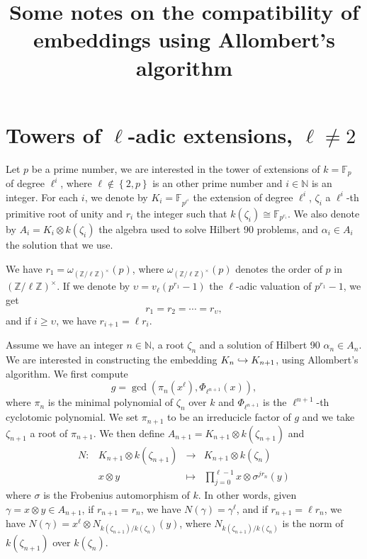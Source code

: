 \documentclass[a4paper,11pt]{article}
\title{Some notes on the compatibility of embeddings using Allombert's algorithm}
\author{}
\begin{document}
\maketitle





\section{Towers of $\ell$-adic extensions, $\ell\neq2$}
\label{sec:ladic}

Let $p$ be a prime number, we are interested in the tower of extensions of
$k=\mathbb{F}_p$ of degree $\ell^i$, where $\ell\notin\left\{ 2, p
\right\}$ is an other prime
number and $i\in\mathbb{N}$ is an integer. For each $i$, we denote by
$K_i=\mathbb{F}_{p^{\ell^i}}$ the extension of degree $\ell^i$, $\zeta_i$ a
$\ell^i$-th primitive root of unity and $r_i$ the integer such that
$k(\zeta_i)\cong\mathbb{F}_{p^{r_i}}$. We also denote by $A_i=K_i\otimes
k(\zeta_i)$ the algebra used to solve Hilbert 90 problems, and $\alpha_i\in A_i$ the
solution that we use.

We have $r_1=\omega_{(\mathbb{Z}/\ell\mathbb{Z})^\times}(p)$, where
$\omega_{(\mathbb{Z}/\ell\mathbb{Z})^\times}(p)$ denotes the order of $p$ in
$(\mathbb{Z}/\ell\mathbb{Z})^\times$. If we denote by $\upsilon=v_\ell(p^{r_1}-1)$
the $\ell$-adic valuation of $p^{r_1}-1$, we get 
\[
  r_1 = r_2 = \cdots = r_{\upsilon},
\]
and if $i\geq\upsilon$, we have $r_{i+1}=\ell r_i$.

Assume we have an integer $n\in\mathbb{N}$, a root
$\zeta_n$ and a solution of Hilbert 90 $\alpha_n\in A_n$. We are interested in
constructing the embedding $K_n\hookrightarrow K_{n+1}$, using Allombert's algorithm. We
first compute 
\[
  g = \gcd(\pi_n(x^\ell), \Phi_{\ell^{n+1}}(x)),
\]
where $\pi_n$ is the minimal polynomial of $\zeta_n$ over $k$ and
$\Phi_{\ell^{n+1}}$ is the $\ell^{n+1}$-th cyclotomic polynomial. We set
$\pi_{n+1}$ to be an irreducicle factor of $g$ and we take $\zeta_{n+1}$ a root
of $\pi_{n+1}$. We then define $A_{n+1}=K_{n+1}\otimes k(\zeta_{n+1})$ and
\[
\begin{array}{cccc}
  N: & K_{n+1}\otimes k(\zeta_{n+1}) & \to & K_{n+1}\otimes k(\zeta_n) \\
  & x\otimes y & \mapsto & \prod_{j=0}^{\ell-1} x \otimes \sigma^{jr_n}(y)
\end{array}
\]
where $\sigma$ is the Frobenius automorphism of $k$. In other words, given
$\gamma=x\otimes y\in A_{n+1}$, if $r_{n+1}=r_n$, we have $N(\gamma) =
\gamma^\ell$, and if $r_{n+1}=\ell r_n$, we have $N(\gamma) = x^\ell\otimes
N_{k(\zeta_{n+1})/k(\zeta_n)}(y)$, where $N_{k(\zeta_{n+1})/k(\zeta_n)}$ is the
norm of $k(\zeta_{n+1})$ over $k(\zeta_n)$. 
\end{document}

